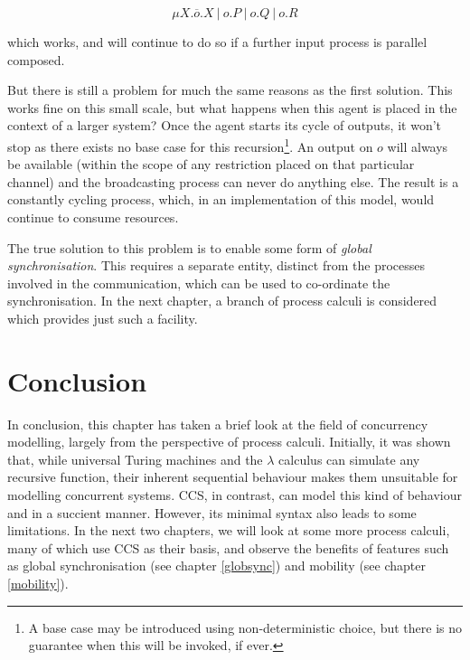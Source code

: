\begin{equation}
\mu X.\overline{o}.X\ |\ o.P\ |\ o.Q\ |\ o.R
\end{equation}

\noindent which works, and will continue to do so if a further
input process is parallel composed.  

But there is still a problem for much the same reasons as the first
solution.  This works fine on this small scale, but what happens when
this agent is placed in the context of a larger system?  Once the agent
starts its cycle of outputs, it won't stop as there exists
no base case for this recursion\footnote{A base case may be introduced
using non-deterministic choice, but there is no guarantee when this will
be invoked, if ever.}.  An output on $o$ will always be available (within
the scope of any restriction placed on that particular channel) and
the broadcasting process can never do anything else.  The result is a
constantly cycling process, which, in an implementation of this model,
would continue to consume resources.

The true solution to this problem is to enable some form of
\emph{global synchronisation}.  This requires a separate entity,
distinct from the processes involved in the communication, which can
be used to co-ordinate the synchronisation.  In the next chapter, a
branch of process calculi is considered which provides just such a
facility.

\section{Conclusion}

In conclusion, this chapter has taken a brief look at the field of
concurrency modelling, largely from the perspective of process
calculi.  Initially, it was shown that, while universal Turing
machines and the $\lambda$ calculus can simulate any recursive
function, their inherent sequential behaviour makes them unsuitable
for modelling concurrent systems.  CCS, in contrast, can model this
kind of behaviour and in a succient manner.  However, its minimal
syntax also leads to some limitations.  In the next two chapters, we
will look at some more process calculi, many of which use CCS as their
basis, and observe the benefits of features such as global
synchronisation (see chapter \ref{globsync}) and mobility (see chapter
\ref{mobility}).





